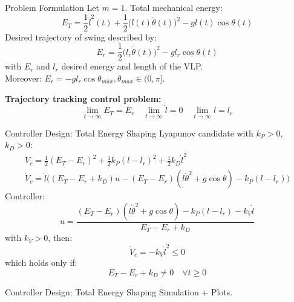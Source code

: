 \documentclass[10pt]{beamer}
\begin{document}
  \begin{frame}{Problem Formulation}
    Let $m=1$. Total mechanical energy:
    \begin{equation*}
      E_T = %
        \frac{1}{2}\dot{l}^2(t)+\frac{1}{2}\big(l(t)\dot{\theta}(t)\big)^2-
        gl(t)\cos\theta(t) 
    \end{equation*}
    Desired trajectory of swing described by:
    \begin{equation*}
      E_r = \frac{1}{2}\big(l_r\dot{\theta}(t)\big)^2-gl_r\cos\theta(t) 
    \end{equation*}
    with $E_r$ and $l_r$ desired energy and length of the VLP.\\Moreover:
    $E_r = -gl_r\cos\theta_{max}, \theta_{max} \in (0,\pi]$.

    \textbf{Trajectory tracking control problem:}
    \begin{equation*}
      \lim_{t\rightarrow \infty} E_T = E_r  \quad
      \lim_{t\rightarrow \infty} \dot{l} = 0 \quad
      \lim_{t\rightarrow \infty} l = l_r
    \end{equation*}
  \end{frame}

  \begin{frame}{Controller Design: Total Energy Shaping}
    Lyapunov candidate with $k_P>0$, $k_D>0$:
    \begin{gather*}
      V_c = \frac{1}{2}(E_T-E_r)^2+\frac{1}{2}k_P(l-l_r)^2+
        \frac{1}{2}k_D\dot{l}^2 \\
      \dot{V}_c = \dot{l}\big((E_T-E_r+k_D)u-(E_T-E_r)(l\dot{\theta}^2+
        g\cos\theta)-k_P(l-l_r) \big)
    \end{gather*}
    Controller:
    \begin{equation*}
      u = \frac{(E_T-E_r)(l\dot{\theta}^2+g\cos\theta)-k_P(l-l_r)-
        k_V\dot{l}}{E_T-E_r+k_D}
    \end{equation*}
    with $k_V>0$, then:
    \begin{equation*}
      \dot{V}_c = -k_V\dot{l}^2 \leq 0
    \end{equation*}
    which holds only if:
    \begin{equation*}
      E_T-E_r+k_D  \neq 0 \quad \forall t\geq 0
    \end{equation*}
  \end{frame}

  \begin{frame}{Controller Design: Total Energy Shaping}
    Simulation + Plots.
  \end{frame}
\end{document}
